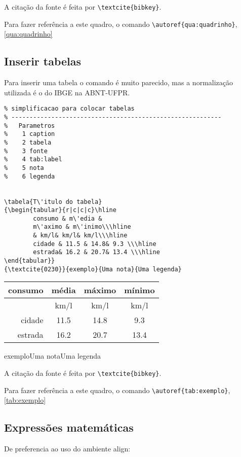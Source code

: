 A citação da fonte é feita por \verb+\textcite{bibkey}+.

Para fazer referência a este quadro, o comando \verb+\autoref{qua:quadrinho}+,\autoref{qua:quadrinho}


\subsection[Tabelas]{Inserir tabelas}

Para inserir uma tabela o comando é muito parecido, mas a normalização utilizada é o do IBGE na ABNT-UFPR.

\begin{lstlisting}
% simplificacao para colocar tabelas
% ----------------------------------------------------------
%   Parametros
%    1 caption
%    2 tabela
%    3 fonte
%    4 tab:label
%    5 nota
%    6 legenda


\tabela{T\'itulo do tabela}
{\begin{tabular}{r|c|c|c}\hline
		consumo & m\'edia & 
		m\'aximo & m\'inimo\\\hline
		& km/l& km/l& km/l\\\hline
		cidade & 11.5 & 14.8& 9.3 \\\hline
		estrada& 16.2 & 20.7& 13.4 \\\hline
\end{tabular}}
{\textcite{0230}}{exemplo}{Uma nota}{Uma legenda}
\end{lstlisting}


{\begin{tabular}{r|c|c|c}\hline
		consumo & m\'edia & 
		m\'aximo & m\'inimo\\\hline
		& km/l& km/l& km/l\\\hline
		cidade & 11.5 & 14.8& 9.3 \\\hline
		estrada& 16.2 & 20.7& 13.4 \\\hline
\end{tabular}}
{\textcite{0230}}{exemplo}{Uma nota}{Uma legenda}


A citação da fonte é feita por \verb+\textcite{bibkey}+.

Para fazer referência a este quadro, o comando \verb+\autoref{tab:exemplo}+, \autoref{tab:exemplo}
\subsection[Equações]{Expressões matemáticas}

De preferencia ao uso do ambiente align:

